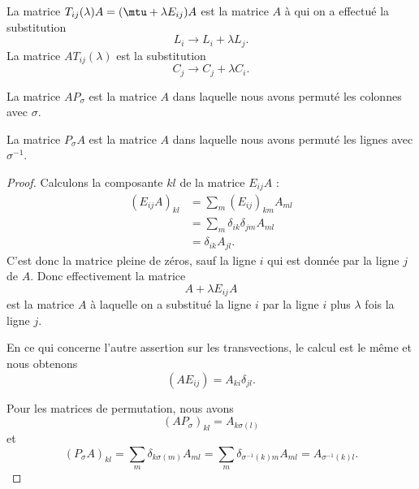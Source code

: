 \begin{lemma}   \label{LemyrAXQs}
    La matrice \( T_{ij}(\lambda)A=(\mtu+\lambda E_{ij})A\) est la matrice \( A\) à qui on a effectué la substitution
    \begin{equation}
        L_i\to L_i+\lambda L_j.
    \end{equation}
    La matrice \( AT_{ij}(\lambda)\) est la substitution
    \begin{equation}
        C_j\to C_j+\lambda C_i.
    \end{equation}

    La matrice \( AP_{\sigma}\) est la matrice \( A\) dans laquelle nous avons permuté les colonnes avec \( \sigma\).

    La matrice \( P_{\sigma}A\) est la matrice \( A\) dans laquelle nous avons permuté les lignes avec \( \sigma^{-1}\).
\end{lemma}

\begin{proof}
    Calculons la composante \( kl\) de la matrice \( E_{ij}A\) :
    \begin{subequations}
        \begin{align}
            (E_{ij}A)_{kl}&=\sum_m(E_{ij})_{km}A_{ml}\\
            &=\sum_m\delta_{ik}\delta_{jm}A_{ml}\\
            &=\delta_{ik}A_{jl}.
        \end{align}
    \end{subequations}
    C'est donc la matrice pleine de zéros, sauf la ligne \( i\) qui est donnée par la ligne \( j\) de \( A\). Donc effectivement la matrice
    \begin{equation}
        A+\lambda E_{ij}A
    \end{equation}
    est la matrice \( A\) à laquelle on a substitué la ligne \( i\) par la ligne \( i\) plus \( \lambda\) fois la ligne \( j\).

    En ce qui concerne l'autre assertion sur les transvections, le calcul est le même et nous obtenons
    \begin{equation}
        (AE_{ij})=A_{ki}\delta_{jl}.
    \end{equation}

    Pour les matrices de permutation, nous avons
    \begin{equation}
        (AP_{\sigma})_{kl}=A_{k\sigma(l)}
    \end{equation}
    et
    \begin{equation}
        (P_{\sigma}A)_{kl}=\sum_m\delta_{k\sigma(m)}A_{ml}=\sum_m\delta_{\sigma^{-1}(k)m}A_{ml}=A_{\sigma^{-1}(k)l}.
    \end{equation}
\end{proof}

